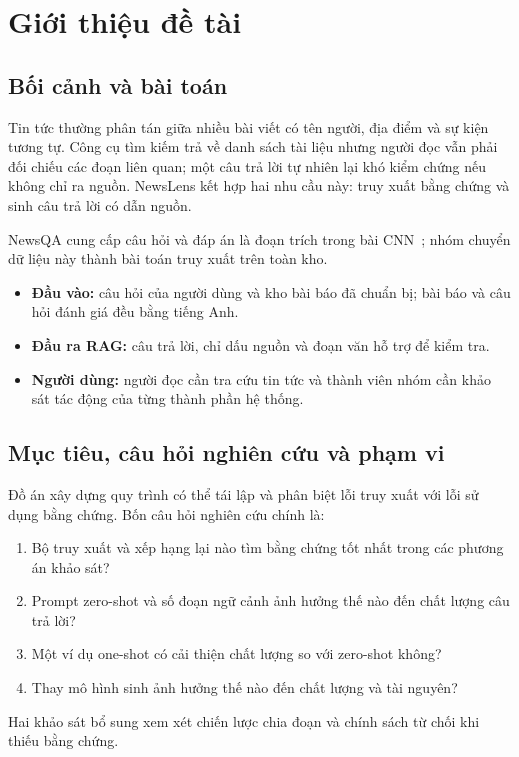 \section{Giới thiệu đề tài}
\subsection{Bối cảnh và bài toán}
Tin tức thường phân tán giữa nhiều bài viết có tên người, địa điểm và sự kiện tương tự. Công cụ tìm kiếm trả về danh sách tài liệu nhưng người đọc vẫn phải đối chiếu các đoạn liên quan; một câu trả lời tự nhiên lại khó kiểm chứng nếu không chỉ ra nguồn. NewsLens kết hợp hai nhu cầu này: truy xuất bằng chứng và sinh câu trả lời có dẫn nguồn.

NewsQA cung cấp câu hỏi và đáp án là đoạn trích trong bài CNN~\cite{newsqa}; nhóm chuyển dữ liệu này thành bài toán truy xuất trên toàn kho.
\begin{itemize}
\item \textbf{Đầu vào:} câu hỏi của người dùng và kho bài báo đã chuẩn bị; bài báo và câu hỏi đánh giá đều bằng tiếng Anh.
\item \textbf{Đầu ra RAG:} câu trả lời, chỉ dấu nguồn và đoạn văn hỗ trợ để kiểm tra.
\item \textbf{Người dùng:} người đọc cần tra cứu tin tức và thành viên nhóm cần khảo sát tác động của từng thành phần hệ thống.
\end{itemize}
\subsection{Mục tiêu, câu hỏi nghiên cứu và phạm vi}
Đồ án xây dựng quy trình có thể tái lập và phân biệt lỗi truy xuất với lỗi sử dụng bằng chứng. Bốn câu hỏi nghiên cứu chính là:
\begin{enumerate}
\item Bộ truy xuất và xếp hạng lại nào tìm bằng chứng tốt nhất trong các phương án khảo sát?
\item Prompt zero-shot và số đoạn ngữ cảnh ảnh hưởng thế nào đến chất lượng câu trả lời?
\item Một ví dụ one-shot có cải thiện chất lượng so với zero-shot không?
\item Thay mô hình sinh ảnh hưởng thế nào đến chất lượng và tài nguyên?
\end{enumerate}

Hai khảo sát bổ sung xem xét chiến lược chia đoạn và chính sách từ chối khi thiếu bằng chứng.

